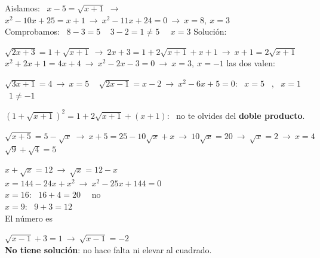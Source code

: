 \documentclass[11pt,a4paper]{article}
\newcommand{\be}[1]{{\color{fmok}\faCheckCircle}\ \ensuremath{#1}}
\newcommand{\mal}[1]{{\color{fmR}\faTimesCircle}\ {\color{fmR}\ensuremath{#1}}}
\begin{document}
\vfill
\begin{exemple}[Ejemplo: \ $x-\sqrt{x+1}=5$]
Aislamos: \ $x-5=\sqrt{x+1}$ \quad $\to$ \quad $x^2-10x+25=x+1\ \to\ x^2-11x+24=0\ \to\ x=8,\ x=3$\\[3pt]
Comprobamos: \ $8-3=5$ \be{} \qquad $3-2=1\neq5$ \ \mal{x=3} \qquad Solución: 
\end{exemple}

\vfill
\begin{exemple}[Ejemplo: \ $\sqrt{2x+3}-\sqrt{x+1}=1$ \ \ (dos radicales)]
$\sqrt{2x+3}=1+\sqrt{x+1}\ \to\ 2x+3=1+2\sqrt{x+1}+x+1\ \to\ x+1=2\sqrt{x+1}$\\[3pt]
$x^2+2x+1=4x+4\ \to\ x^2-2x-3=0\ \to\ x=3,\ x=-1$ \qquad las dos valen: \ 
\end{exemple}

\vfill
\begin{exemple}[Ejemplos]
$\sqrt{3x+1}=4\ \to\ x=5$ \be{} \qquad $\sqrt{2x-1}=x-2\ \to\ x^2-6x+5=0$: \ $x=5$ \be{}, \ $x=1$ \mal{1\neq-1}
\end{exemple}

\vfill
\begin{truc}
$(1+\sqrt{x+1})^2=1+2\sqrt{x+1}+(x+1)$: \ no te olvides del \textbf{doble producto}.
\end{truc}

\vfill
\begin{exemple}[Ejemplo: \ $\sqrt{x+5}+\sqrt x=5$ \ (dejamos un radical en cada miembro)]
$\sqrt{x+5}=5-\sqrt x\ \to\ x+5=25-10\sqrt x+x\ \to\ 10\sqrt x=20\ \to\ \sqrt x=2\ \to\ \boxed{x=4}$ \quad $\sqrt9+\sqrt4=5$ \be{}
\end{exemple}

\vfill
\begin{minipage}[t]{0.48\linewidth}
\begin{exemple}
$x+\sqrt x=12\ \to\ \sqrt x=12-x$\\[3pt]
$x=144-24x+x^2\ \to\ x^2-25x+144=0$\\[3pt]
$x=16$: \ $16+4=20$ \ \mal{\text{no}}\\[2pt] $x=9$: \ $9+3=12$ \ \be{}\\[3pt]
El número es 
\end{exemple}
\end{minipage}\hfill
\begin{minipage}[t]{0.49\linewidth}
\begin{compte}
$\sqrt{x-1}+3=1\ \to\ \sqrt{x-1}=-2$\\[3pt]
\textbf{No tiene solución}: no hace falta ni elevar al cuadrado.
\end{compte}
\end{minipage}
\end{document}

